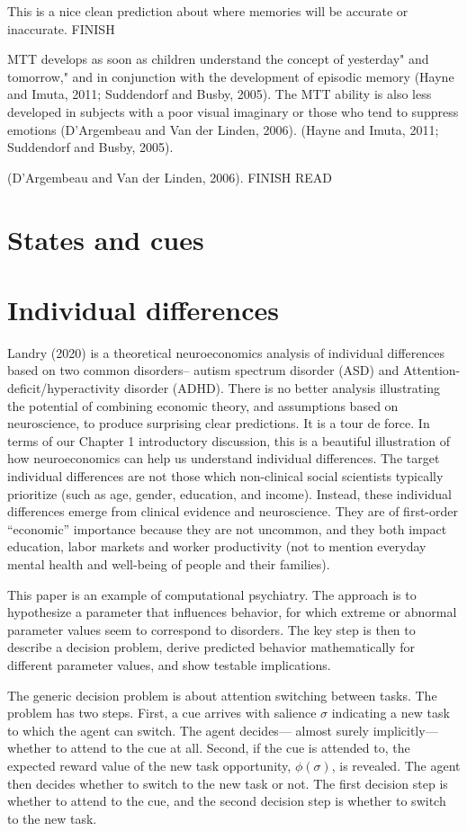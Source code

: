 \documentclass{article}
\begin{document}
This is a nice clean prediction about where memories will be accurate or inaccurate. 
FINISH

MTT develops as soon as children understand the concept
of yesterday" and tomorrow," and in conjunction with the development of episodic
memory (Hayne and Imuta, 2011; Suddendorf and Busby, 2005). The MTT ability is also
less developed in subjects with a poor visual imaginary or those who tend to suppress
emotions (D'Argembeau and Van der Linden, 2006).
(Hayne and Imuta, 2011; Suddendorf and Busby, 2005).

(D'Argembeau and Van der Linden, 2006).  FINISH READ
\section{States and cues}

\section{Individual differences}
Landry (2020) is a theoretical neuroeconomics analysis of individual differences based on two common disorders-- autism spectrum disorder (ASD) and Attention-deficit/hyperactivity disorder (ADHD). There is no better analysis illustrating the potential of combining economic theory, and assumptions based on neuroscience, to produce surprising clear predictions. It is a tour de force. 
In terms of our Chapter 1 introductory discussion, this is a beautiful illustration of how neuroeconomics can help us understand individual differences. The target individual differences are not those which non-clinical social scientists typically prioritize (such as age, gender, education, and income). Instead, these individual differences emerge from clinical evidence and neuroscience. They are of first-order “economic” importance because they are not uncommon, and they both impact education, labor markets and worker productivity (not to mention everyday mental health and well-being of people and their families). 

This paper is an example of computational psychiatry. The approach is to hypothesize a parameter that influences behavior, for which extreme or abnormal parameter values seem to correspond to disorders. The key step is then to describe a decision problem, derive predicted behavior mathematically for different parameter values, and show testable implications.  

The generic decision problem is about attention switching between tasks. The problem has two steps. First, a cue arrives with salience $\sigma$ indicating a new task to which the agent can switch. The agent decides— almost surely implicitly—whether to attend to the cue at all. Second, if the cue is attended to, the expected reward value of the new task opportunity, $\phi(\sigma)$,  is revealed. The agent then decides whether to switch to the new task or not. The first decision step is whether to attend to the cue, and the second decision step is whether to switch to the new task.
\end{document}
